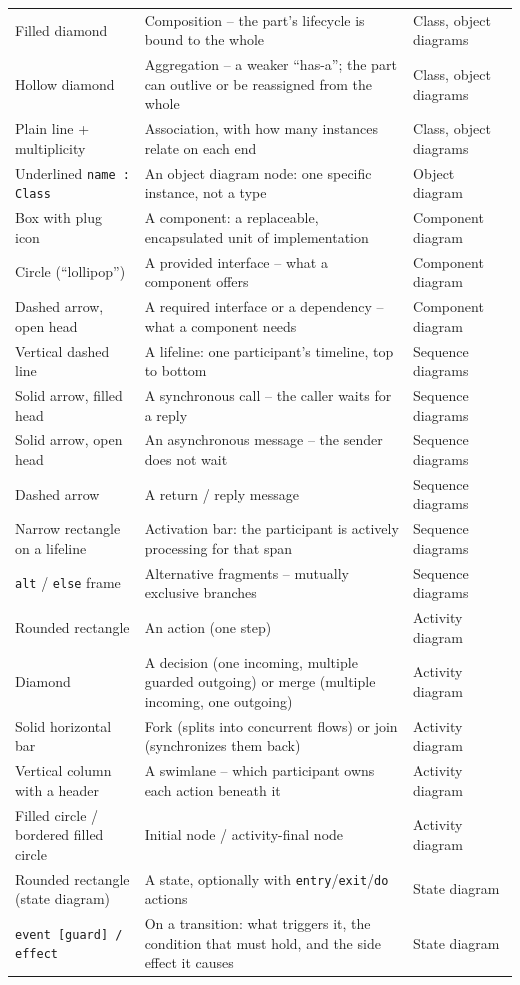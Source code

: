 \documentclass[11pt,a4paper]{report}
\begin{document}
\begin{longtable}{L{3.0cm} L{6.4cm} L{4.6cm}}
Filled diamond & Composition -- the part's lifecycle is bound to the whole & Class, object diagrams \\
Hollow diamond & Aggregation -- a weaker ``has-a''; the part can outlive or be reassigned from the whole & Class, object diagrams \\
Plain line + multiplicity & Association, with how many instances relate on each end & Class, object diagrams \\
Underlined \texttt{name : Class} & An object diagram node: one specific instance, not a type & Object diagram \\
Box with plug icon & A component: a replaceable, encapsulated unit of implementation & Component diagram \\
Circle (``lollipop'') & A provided interface -- what a component offers & Component diagram \\
Dashed arrow, open head & A required interface or a dependency -- what a component needs & Component diagram \\
Vertical dashed line & A lifeline: one participant's timeline, top to bottom & Sequence diagrams \\
Solid arrow, filled head & A synchronous call -- the caller waits for a reply & Sequence diagrams \\
Solid arrow, open head & An asynchronous message -- the sender does not wait & Sequence diagrams \\
Dashed arrow & A return / reply message & Sequence diagrams \\
Narrow rectangle on a lifeline & Activation bar: the participant is actively processing for that span & Sequence diagrams \\
\texttt{alt} / \texttt{else} frame & Alternative fragments -- mutually exclusive branches & Sequence diagrams \\
Rounded rectangle & An action (one step) & Activity diagram \\
Diamond & A decision (one incoming, multiple guarded outgoing) or merge (multiple incoming, one outgoing) & Activity diagram \\
Solid horizontal bar & Fork (splits into concurrent flows) or join (synchronizes them back) & Activity diagram \\
Vertical column with a header & A swimlane -- which participant owns each action beneath it & Activity diagram \\
Filled circle / bordered filled circle & Initial node / activity-final node & Activity diagram \\
Rounded rectangle (state diagram) & A state, optionally with \texttt{entry}/\texttt{exit}/\texttt{do} actions & State diagram \\
\texttt{event [guard] / effect} & On a transition: what triggers it, the condition that must hold, and the side effect it causes & State diagram \\
\bottomrule
\end{longtable}
\end{document}
